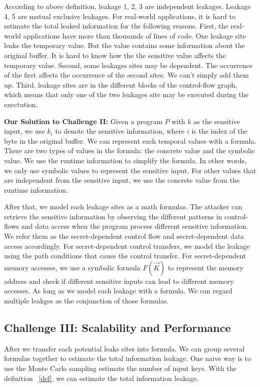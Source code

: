 According to above definition, leakage 1, 2, 3 are independent leakages. Leakage 4, 5
are mutual exclusive leakages. 
For real-world applications, it is hard to estimate the total leaked information for the following reasons.
First, the real-world applications have more than thousands of lines of code. One leakage site leaks the temporary value. 
But the value contains some information about the original buffer. It is hard to know how the 
the sensitive value affects the temporary value. Second, some leakages sites may be
dependent. The occurrence of the first affects the occurrence of the second sites. We 
can't simply add them up. Third, leakage sites are in the different blocks of the 
control-flow graph, which means that only one of the two leakages site may be executed
during the exectution.

\textbf{Our Solution to Challenge II:}
Given a program $P$ with $k$ as the sensitive input, 
we use $k_i$ to denote the sensitive information, where $i$ is the index of the byte in the original buffer.  
We can represent each temporal
values with a formula. There are two types of values in the formula: the concrete value and
the symbolic value. We use the runtime information to simplify the formula. In other words,
we only use symbolic values to represent the sensitive input. For other values that are
independent from the sensitive input, we use the concrete value from the runtime information. 

After that, we model each leakage sites as a math formulas.
The attacker can retrieve the sensitive information by observing the different patterns in 
control-flows and data access when the program process different sensitive information. 
We refer them as the secret-dependent control flow and secret-dependent data access accordingly.
For secret-dependent control transfers, we model the leakage using the path conditions that cause the control
transfer. For secret-dependent memory accesses, we use a symbolic formula $F(\vec{K})$ to
represent the memory address and check if different sensitive inputs can lead to different
memory accesses. As long as we model each leakage with a formula. We can regard multiple leakges as the conjunction of
those formulas. 

\subsection{Challenge III: Scalability and Performance}

After we transfer each potential leaks sites into formula. We can group several formulas together
to estimate the total information leakage. One naive way is to use the Monte Carlo sampling  estimate the
number of input keys. With the definition ~\ref{def}, we can estimate the total information leakage.

